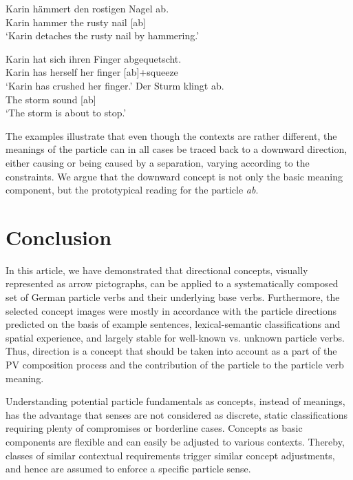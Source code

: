 \documentclass[output=paper]{langsci/langscibook}
\begin{document}
\ea\label{ex:abhaemmern}
\gll Karin hämmert den rostigen Nagel ab.\\
Karin hammer the rusty nail [ab]\\
\glt `Karin detaches the rusty nail by hammering.'



\ex\label{ex:abquetschen}
\gll Karin hat sich ihren Finger abgequetscht.\\
Karin has herself her finger [ab]+squeeze\\
\glt `Karin has crushed her finger.'
\ex \label{ex:abklingenSturm}
\gll Der Sturm klingt ab.\\
The storm sound [ab]\\
\glt `The storm is about to stop.'
\z

The examples illustrate that even though the contexts are rather
different, the meanings of the particle can in all cases be traced
back to a downward direction, either causing or being caused by a
separation, varying according to the constraints. We argue that the
downward concept is not only the basic meaning component, but the
prototypical reading for the particle \textit{ab}.


\section{Conclusion}

In this article, we have demonstrated that directional concepts, visually
represented as arrow pictographs, can be applied to a systematically
composed set of German particle verbs and their underlying base
verbs. Furthermore, the selected concept images were mostly in
accordance with the particle directions predicted on the basis of
example sentences, lexical-semantic classifications and spatial
experience, and largely stable for well-known vs. unknown particle
verbs. Thus, direction is a concept that should be taken into account
as a part of the PV composition process and the contribution of the
particle to the particle verb meaning.

Understanding potential particle fundamentals as concepts, instead of
meanings, has the advantage that senses are not considered as
discrete, static classifications requiring plenty of compromises or
borderline cases. Concepts as basic components are flexible and can
easily be adjusted to various contexts. Thereby, classes of similar
contextual requirements trigger similar concept adjustments, and hence
are assumed to enforce a specific particle sense.
\end{document}
